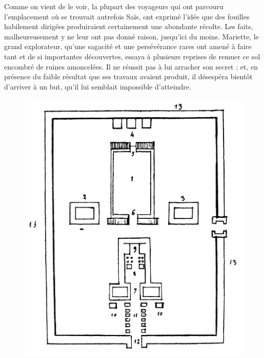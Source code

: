 \documentclass[letterpaper,twocolumn,openany,nodeprecatedcode]{dndbook}
\begin{document}
Comme on vient de le voir, la plupart des voyageurs qui ont parcouru l'emplacement où se trouvait autrefois Saïs, ont exprimé l'idée que des fouilles habilement dirigées produiraient certainement une abondante récolte. Les faits, malheureusement y ne leur ont pas donné raison, jusqu'ici du moins. Mariette, le grand explorateur, qu'une sagacité et une persévérance rares ont amené à faire tant et de si importantes découvertes, essaya à plusieurs reprises de remuer ce sol encombré de ruines amoncelées. Il ne réussit pas à lui arracher son secret ; et, en présence du faible résultat que ses travaux avaient produit, il désespéra bientôt d'arriver à un but, qu'il lui semblait impossible d'atteindre.
\clearpage
\onecolumn
\begin{figure}[H]
\centering
\includegraphics[height=0.5\textheight,keepaspectratio]{lecultedeneit.png}
\end{figure}
\end{document}
